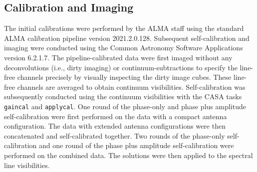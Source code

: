 \documentclass[linenumbers, twocolumn, twocolappendix, astrosymb, times]{aastex631}
\begin{document}
\subsection{Calibration and Imaging}
The initial calibrations were performed by the ALMA staff using the standard ALMA calibration pipeline version 2021.2.0.128. Subsequent self-calibration and imaging were conducted using the Common Astronomy Software Applications \citep[CASA;][]{CASA} version 6.2.1.7. The pipeline-calibrated data were first imaged without any deconvolutions (i.e., dirty imaging) or continuum-subtractions to specify the line-free channels precisely by visually inspecting the dirty image cubes. These line-free channels are averaged to obtain continuum visibilities. Self-calibration was subsequently conducted using the continuum visibilities with the CASA tasks \texttt{gaincal} and \texttt{applycal}. One round of the phase-only and phase plus amplitude self-calibration were first performed on the data with a compact antenna configuration. The data with extended antenna configurations were then concatenated and self-calibrated together. Two rounds of the phase-only self-calibration and one round of the phase plus amplitude self-calibration were performed on the combined data. The solutions were then applied to the spectral line visibilities.
\end{document}
